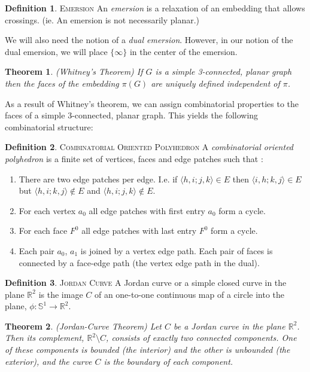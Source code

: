 \documentclass[11pt]{article}
\newcommand{\R}{\mathbb{R}}
\newtheorem{theorem}{Theorem}[section]
\theoremstyle{definition}
\newtheorem{definition}{Definition}[section]
\begin{document}
	\theoremstyle{definition}
	\begin{definition}{\textsc{Emersion}}
		An \emph{emersion} is a relaxation of an embedding that allows crossings. (ie. An emersion is not necessarily planar.)
	\end{definition}
	
	We will also need the notion of a \emph{dual emersion}. However, in our notion of the dual emersion, we will place $\{\infty\}$ in the center of the emersion.
	
	\begin{theorem}{(Whitney's Theorem)}
		If $G$ is a simple 3-connected, planar graph then the faces of the embedding $\pi(G)$ are uniquely defined independent of $\pi$.
	\end{theorem}
	
	As a result of Whitney's theorem, we can assign combinatorial properties to the faces of a simple 3-connected, planar graph. 
	This yields the following combinatorial structure:
	\theoremstyle{definition}
	\begin{definition}{\textsc{Combinatorial Oriented Polyhedron}}
		A \emph{combinatorial oriented polyhedron} is a finite set of vertices, faces and edge patches such that \cite{mccProof}:
		\begin{enumerate}
			\item There are two edge patches per edge. I.e. if $\langle h,i;j,k \rangle \in E$ then $\langle i,h;k,j \rangle \in E$ but $ \langle h,i;k,j \rangle \not\in E$ and $\langle h,i;j,k \rangle \not\in E$.
			\item For each vertex $a_0$ all edge patches with first entry $a_0$ form a cycle. 
			\item For each face $F^0$ all edge patches with last entry $F^0$ form a cycle.
			\item Each pair $a_0$, $a_1$ is joined by a vertex edge path. Each pair of faces is connected by a face-edge path (the vertex edge path in the dual). 
		\end{enumerate}
	\end{definition}

	\theoremstyle{definition}
	\begin{definition}{\textsc{Jordan Curve}}
		A Jordan curve or a simple closed curve in the plane $\R^2$ is the image $C$ of an one-to-one continuous map of a circle into the plane, $\phi : \mathbb{S}^1 \rightarrow \R^2$. 
	\end{definition}
	
	\begin{theorem}{(Jordan-Curve Theorem)}
		Let $C$ be a Jordan curve in the plane $\R^2$. 
		Then its complement, $\R^2 \setminus C$, consists of exactly two connected components. 
		One of these components is bounded (the interior) and the other is unbounded (the exterior), and the curve $C$ is the boundary of each component.
	\end{theorem}
\end{document}
